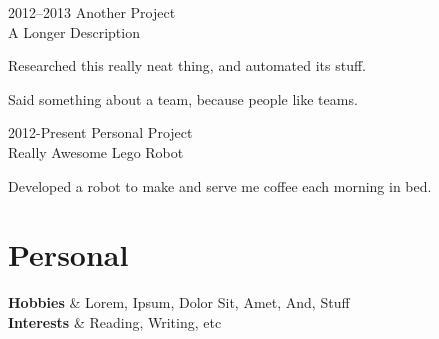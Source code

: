 \documentclass[10pt]{article}
\begin{document}
    \begin{CvBlockEnv}
      {2012--2013}
      {Another Project \\ A Longer Description}
      \begin{citemize}
        \item Researched this really neat thing, and automated its stuff.
        \item Said something about a team, because people like teams.
      \end{citemize}
    \end{CvBlockEnv}
    
    \begin{CvBlockEnv}
      {2012-Present}
      {Personal Project \\ Really Awesome Lego Robot}
      \begin{citemize}
        \item Developed a robot to make and serve me coffee each morning in bed.
      \end{citemize}
    \end{CvBlockEnv}     

  \section*{Personal}
    
    \begin{CvTable}
      \textbf{Hobbies}   & Lorem, Ipsum, Dolor Sit, Amet, And, Stuff\\
      \textbf{Interests} & Reading, Writing, etc
    \end{CvTable}
\end{document}
